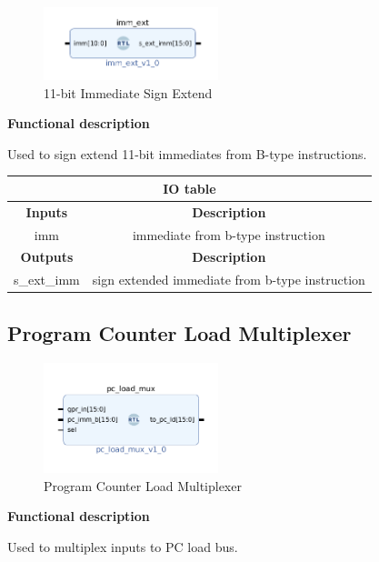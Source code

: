 \documentclass{article}
\begin{document}
\begin{par}
	\begin{figure}[H]
		\centering
		\includegraphics[width=2in]{img/immExt.png}
		\caption{11-bit Immediate Sign Extend}
	\end{figure}
	
	\textbf{Functional description}
	\begin{par}
		Used to sign extend 11-bit immediates from B-type instructions.  
	\end{par}
	
	\begin{center}
		\begin{tabular}{|c|c|}
			\hline 
			\multicolumn{2}{|c|}{\textbf{IO table}} \\
			\hline 
			\textbf{Inputs} & \textbf{Description} \\ 
			\hline 
			imm & immediate from b-type instruction \\ 
			\hline 
			\textbf{Outputs} & \textbf{Description} \\ 
			\hline 
			s\_ext\_imm & sign extended immediate from b-type instruction \\
			\hline
		\end{tabular} 
	\end{center}

	\newpage

	\subsection{Program Counter Load Multiplexer}
	
	\begin{figure}[H]
		\centering
		\includegraphics[width=2in]{img/pclmux.png}
		\caption{Program Counter Load Multiplexer}
	\end{figure}
	
	\textbf{Functional description}
	\begin{par}
		Used to multiplex inputs to PC load bus.
	\end{par} 
	

\end{par}
\end{document}
